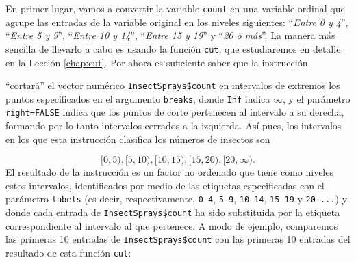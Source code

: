 \documentclass[
]{book}
\newenvironment{Shaded}{\begin{snugshade}}{\end{snugshade}}
\newcommand{\DataTypeTok}[1]{\textcolor[rgb]{0.13,0.29,0.53}{#1}}
\newcommand{\DecValTok}[1]{\textcolor[rgb]{0.00,0.00,0.81}{#1}}
\newcommand{\KeywordTok}[1]{\textcolor[rgb]{0.13,0.29,0.53}{\textbf{#1}}}
\newcommand{\NormalTok}[1]{#1}
\newcommand{\OperatorTok}[1]{\textcolor[rgb]{0.81,0.36,0.00}{\textbf{#1}}}
\newcommand{\OtherTok}[1]{\textcolor[rgb]{0.56,0.35,0.01}{#1}}
\newcommand{\StringTok}[1]{\textcolor[rgb]{0.31,0.60,0.02}{#1}}
\theoremstyle{definition}
\theoremstyle{definition}
\theoremstyle{definition}
\theoremstyle{remark}
\begin{document}
En primer lugar, vamos a convertir la variable \texttt{count} en una variable ordinal que agrupe las entradas de la variable original en los niveles siguientes: ``\emph{Entre 0 y 4}'', ``\emph{Entre 5 y 9}'', ``\emph{Entre 10 y 14}'', ``\emph{Entre 15 y 19}'' y ``\emph{20 o más}''. La manera más sencilla de llevarlo a cabo es usando la función \texttt{cut}, que estudiaremos en detalle en la Lección \ref{chap:cut}. Por ahora es suficiente saber que la instrucción

\begin{Shaded}
\end{Shaded}

``cortará'' el vector numérico \texttt{InsectSprays\$count} en intervalos de extremos los puntos especificados en el argumento \texttt{breaks}, donde \texttt{Inf} indica \(\infty\), y el parámetro \texttt{right=FALSE} indica que los puntos de corte pertenecen al intervalo a su derecha, formando por lo tanto intervalos cerrados a la izquierda. Así pues, los intervalos en los que esta instrucción clasifica los números de insectos son

\[
[0,5), [5,10), [10,15), [15,20), [20,\infty).
\]
El resultado de la instrucción es un factor no ordenado que tiene como niveles estos intervalos, identificados por medio de las etiquetas especificadas con el parámetro \texttt{labels} (es decir, respectivamente, \texttt{0-4}, \texttt{5-9}, \texttt{10-14}, \texttt{15-19} y \texttt{20-...}) y donde cada entrada de \texttt{InsectSprays\$count} ha sido substituida por la etiqueta correspondiente al intervalo al que pertenece. A modo de ejemplo, comparemos las primeras 10 entradas de \texttt{InsectSprays\$count} con las primeras 10 entradas del resultado de esta función \texttt{cut}:
\end{document}
